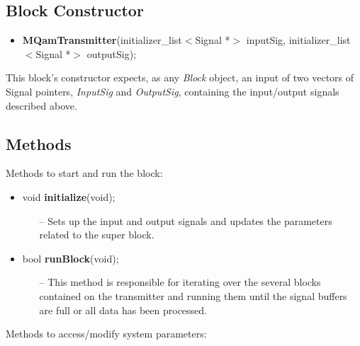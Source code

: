 \subsection*{Block Constructor}

\begin{itemize}
  \item \textbf{MQamTransmitter}(initializer\_list$<$Signal *$>$ inputSig, initializer\_list$<$Signal *$>$ outputSig);
\end{itemize}
This block's constructor expects, as any \textit{Block} object, an input of two vectors of Signal pointers, \textit{InputSig} and \textit{OutputSig}, containing the input/output signals described above.


\subsection*{Methods}
Methods to start and run the block:
\begin{itemize}
     \item void \textbf{initialize}(void);
         \begin{itemize}
             \item[--] Sets up the input and output signals and updates the parameters related to the super block.
         \end{itemize}
     \item bool \textbf{runBlock}(void);
         \begin{itemize}
            \item[--] This method is responsible for iterating over the several blocks contained on the transmitter and running them until the signal buffers are full or all data has been processed.
         \end{itemize}
\end{itemize}
Methods to access/modify system parameters:
